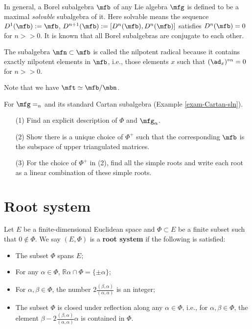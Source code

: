 \begin{rem}
	In general, a Borel subalgebra $\mfb$ of any Lie algebra $\mfg$ is defined to be a maximal \emph{solvable} subalgebra of it. Here solvable means the sequence $D^1(\mfb):=\mfb$, $D^{n+1}(\mfb):=[D^n(\mfb),D^n(\mfb)]$ satisfies $D^n(\mfb)=0$ for $n>>0$. It is known that all Borel subalgebras are conjugate to each other.

	The subalgebra $\mfn\subset \mfb$ is called the nilpotent radical because it contains exactly nilpotent elements in $\mfb$, i.e., those elements $x$ such that $(\ad_x)^{\circ n}=0$ for $n>>0$.

	Note that we have $\mft \simeq \mfb/\mbn$.
\end{rem}

\begin{exe}
	 For $\mfg=\sl_n$ and its standard Cartan subalgebra (Example \ref{exam-Cartan-sln}).
	\begin{itemize}
	 	\item[(1)]
	 		Find an explicit description of $\Phi$ and $\mfg_\alpha$.
	 	\item[(2)]
	 		Show there is a unique choice of $\Phi^+$ such that the corresponding $\mfb$ is the subspace of upper triangulated matrices.
	 	\item[(3)] 
	 		For the choice of $\Phi^+$ in (2), find all the simple roots and write each root as a linear combination of these simple roots.
	 \end{itemize}  
\end{exe}

\section{Root system}

\begin{defn}
	Let $E$ be a finite-dimensional Euclidean space and $\Phi\subset E$ be a finite subset such that $0\notin \Phi$. We say $(E,\Phi)$ is a \textbf{root system} if the following is satisfied:
	\begin{itemize}
		\item 
			The subset $\Phi$ spans $E$;
		\item 
			For any $\alpha\in \Phi$, $\mathbb{R}\alpha\cap \Phi = \{\pm \alpha\}$;
		\item
			For $\alpha,\beta\in \Phi$, the number $2\frac{ (\beta,\alpha) }{(\alpha,\alpha)}$ is an integer;
		\item
			The subset $\Phi$ is closed under reflection along any $\alpha\in \Phi$, i.e., for $\alpha,\beta\in \Phi$, the element $\beta-2\frac{ (\beta,\alpha) }{(\alpha,\alpha)} \alpha$ is contained in $\Phi$.
	\end{itemize}
\end{defn}

